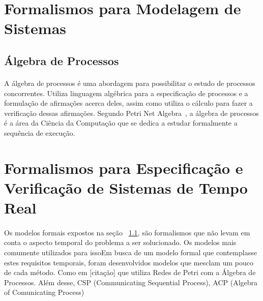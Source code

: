 \section{Formalismos para Modelagem de Sistemas}

\subsection{Álgebra de Processos}
\label{sec:Álgebra de Processos}
\paragraph{}
A álgebra de processos é uma abordagem para possibilitar o estudo de processos concorrentes. Utiliza linguagem algébrica
para a especificação de processos e a formulação de afirmações acerca deles, assim como utiliza o cálculo para fazer a
verificação dessas afirmações. Segundo Petri Net Algebra~\cite{books/daglib/0003970}, a álgebra de processos é a área da
Ciência da Computação que se dedica a estudar formalmente a sequência de execução.

%
%

\section{Formalismos para Especificação e Verificação de Sistemas de Tempo Real}
\paragraph{}
Os modelos formais expostos na seção ~\ref{sec:Álgebra de Processos}, são formalismos que não levam em conta o aspecto temporal do problema
a ser solucionado. Os modelos mais comumente utilizados para issoEm busca de um modelo formal que contemplasse estes requisitos temporais, foram desenvolvidos
modelos que mesclam um pouco de cada método. Como em [citação] que utiliza Redes de Petri com a Álgebra de Processos.
Além desse, CSP (Communicating Sequential Process), ACP (Algebra of Comunicating Process)


